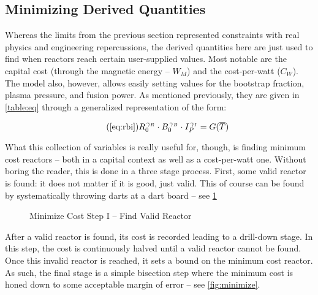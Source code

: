 \subsection{Minimizing Derived Quantities} 

Whereas the limits from the previous section represented constraints with real physics and engineering repercussions, the derived quantities here are just used to find when reactors reach certain user-supplied values. Most notable are the capital cost (through the magnetic energy -- $W_M$) and the cost-per-watt ($C_W$). The model also, however, allows easily setting values for the bootstrap fraction, plasma pressure, and fusion power. As mentioned previously, they are given in \cref{table:eq} through a generalized representation of the form:

\begin{equation}
	\tag{\ref{eq:rbi}}
	R_0^{\, \gamma_R} \cdot B_0^{\, \gamma_B} \cdot I_P^{\, \gamma_I} = G( \overline T )
\end{equation}

What this collection of variables is really useful for, though, is finding minimum cost reactors -- both in a capital context as well as a cost-per-watt one. Without boring the reader, this is done in a three stage process. First, some valid reactor is found: it does not matter if it is good, just valid. This of course can be found by systematically throwing darts at a dart board -- see \cref{fig:step_one}

\begin{figure}[h]
\centering
\begin{adjustbox}{width=0.8\textwidth}
	
\end{adjustbox}
\caption{Minimize Cost Step I -- Find Valid Reactor}
\label{fig:step_one}
\end{figure}

After a valid reactor is found, its cost is recorded leading to a drill-down stage. In this step, the cost is continuously halved until a valid reactor cannot be found. Once this invalid reactor is reached, it sets a bound on the minimum cost reactor. As such, the final stage is a simple bisection step where the minimum cost is honed down to some acceptable margin of error -- see \cref{fig:minimize}.

